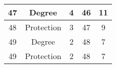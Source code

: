 \documentclass[results.tex]{subfiles}
\begin{document}
\begin{center}
\begin{tabular}{| c || c | c | c | c |}
            \hline
            47                      & Degree                       & 4                      & 46                      & 11                   \\
            \hline
            48                      & Protection                   & 3                      & 47                      & 9                    \\
            \hline
            49                      & Degree                       & 2                      & 48                      & 7                    \\
            \hline
            49                      & Protection                   & 2                      & 48                      & 7                    \\
            \hline
        \end{tabular}
    \end{center}
\end{document}
